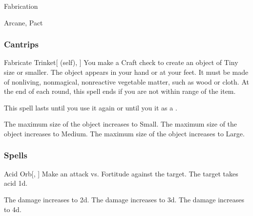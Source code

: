 \newpage
\begin{spellsection}{Fabrication}

\begin{spellheader}
\end{spellheader}


 Arcane, Pact

\subsubsection{Cantrips}


\begin{attuneability}{Fabricate Trinket}[ (self), ]
You make a Craft check to create an object of Tiny size or smaller.
The object appears in your hand or at your feet.
It must be made of nonliving, nonmagical, nonreactive vegetable matter, such as wood or cloth.
At the end of each round, this spell ends if you are not within \rngmed range of the item.

This spell lasts until you use it again or until you  it as a .

\rankline
{} The maximum size of the object increases to Small.
 The maximum size of the object increases to Medium.
 The maximum size of the object increases to Large.
\end{attuneability}

\end{spellsection}


\subsubsection{Spells}


\lowercase{\hypertarget{spell:Acid Orb}{}}\label{spell:Acid Orb}
\begin{freeability}[Rank 1]{\hypertarget{spell:Acid Orb}{Acid Orb}}[, ]
Make an attack vs. Fortitude against the target.
\hit The target takes acid  \plus1d.

\rankline
{} The damage increases to  \plus2d.
 The damage increases to  \plus3d.
 The damage increases to  \plus4d.
\end{freeability}
\vspace{0.25em}



